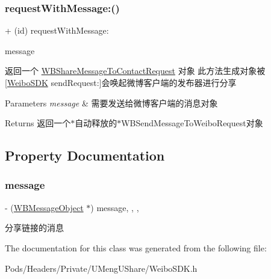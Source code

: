 \subsubsection{\texorpdfstring{request\+With\+Message\+:()}{requestWithMessage:()}\hspace{0.1cm}{\footnotesize\ttfamily [3/3]}}
{\footnotesize\ttfamily + (id) request\+With\+Message\+: \begin{DoxyParamCaption}\item[{(\mbox{\hyperlink{interface_w_b_message_object}{W\+B\+Message\+Object}} $\ast$)}]{message }\end{DoxyParamCaption}}

返回一个 \mbox{\hyperlink{interface_w_b_share_message_to_contact_request}{W\+B\+Share\+Message\+To\+Contact\+Request}} 对象 此方法生成对象被\mbox{[}\mbox{\hyperlink{interface_weibo_s_d_k}{Weibo\+S\+DK}} send\+Request\+:\mbox{]}会唤起微博客户端的发布器进行分享 
\begin{DoxyParams}{Parameters}
{\em message} & 需要发送给微博客户端的消息对象 \\
\hline
\end{DoxyParams}
\begin{DoxyReturn}{Returns}
返回一个$\ast$自动释放的$\ast$\+W\+B\+Send\+Message\+To\+Weibo\+Request对象 
\end{DoxyReturn}


\subsection{Property Documentation}
\mbox{\label{interface_w_b_share_message_to_contact_request_afe9678dacdedf75e35379869a5a4c365}} 
\subsubsection{\texorpdfstring{message}{message}}
{\footnotesize\ttfamily -\/ (\mbox{\hyperlink{interface_w_b_message_object}{W\+B\+Message\+Object}} $\ast$) message\hspace{0.3cm}{\ttfamily [read]}, {\ttfamily [write]}, {\ttfamily [nonatomic]}, {\ttfamily [strong]}}

分享链接的消息 

The documentation for this class was generated from the following file\+:\begin{DoxyCompactItemize}
\item 
Pods/\+Headers/\+Private/\+U\+Meng\+U\+Share/Weibo\+S\+D\+K.\+h\end{DoxyCompactItemize}
